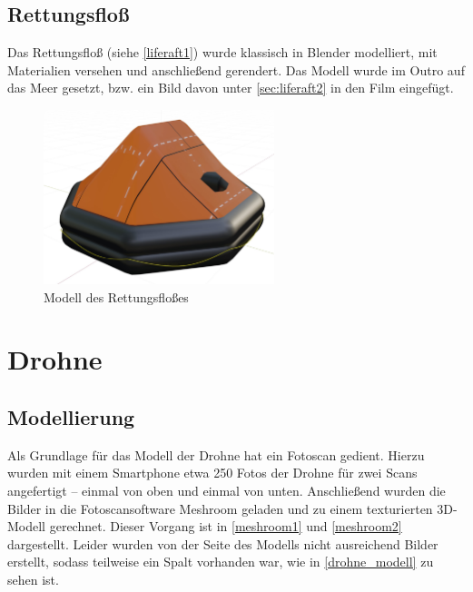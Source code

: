 \subsection{Rettungsfloß}

\label{sec:liferaft1}

Das Rettungsfloß (siehe \autoref{liferaft1}) wurde klassisch in Blender modelliert, mit Materialien versehen und anschließend gerendert. Das Modell wurde im Outro auf das Meer gesetzt, bzw. ein Bild davon unter \autoref{sec:liferaft2} in den Film eingefügt.

\begin{figure}[H]
\begin{center}
\includegraphics[width=0.6\textwidth]{gfx/prod/boat/liferaft1.jpg}
\caption{Modell des Rettungsfloßes}
\label{liferaft1}
\end{center}
\end{figure}
%
\section{Drohne}

\subsection{Modellierung}

Als Grundlage für das Modell der Drohne hat ein Fotoscan gedient. Hierzu wurden mit einem Smartphone etwa 250 Fotos der Drohne für zwei Scans angefertigt -- einmal von oben und einmal von unten. Anschließend wurden die Bilder in die Fotoscansoftware Meshroom geladen und zu einem texturierten 3D-Modell gerechnet. Dieser Vorgang ist in \autoref{meshroom1} und \autoref{meshroom2} dargestellt. Leider wurden von der Seite des Modells nicht ausreichend Bilder erstellt, sodass teilweise ein Spalt vorhanden war, wie in \autoref{drohne_modell} zu sehen ist.\\

